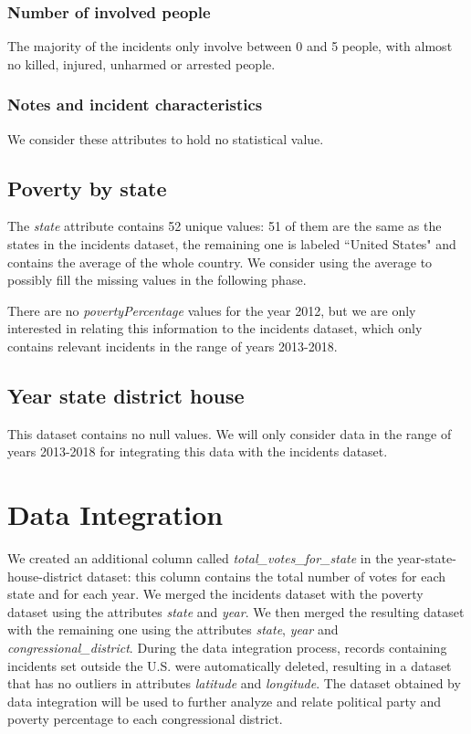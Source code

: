 \documentclass[10pt,a4paper]{report}
\begin{document}
\subsubsection{Number of involved people}

The majority of the incidents only involve between 0 and 5 people, with almost no killed, injured, unharmed or arrested people.

\subsubsection{Notes and incident characteristics}

We consider these attributes to hold no statistical value.

\subsection{Poverty by state}

The \textit{state} attribute contains 52 unique values: 51 of them are the same as the states in the incidents dataset, the remaining one is labeled ``United States" and contains the average of the whole country.
We consider using the average to possibly fill the missing values in the following phase.

There are no \textit{povertyPercentage} values for the year 2012, but we are only interested in relating this information to the incidents dataset, which only contains relevant incidents in the range of years 2013-2018.

\subsection{Year state district house}

This dataset contains no null values.
We will only consider data in the range of years 2013-2018 for integrating this data with the incidents dataset.

\section{Data Integration}

We created an additional column called \textit{total\_votes\_for\_state} in the year-state-house-district dataset: this column contains the total number of votes for each state and for each year.
We merged the incidents dataset with the poverty dataset using the attributes \textit{state} and \textit{year}.
We then merged the resulting dataset with the remaining one using the attributes \textit{state}, \textit{year} and \textit{congressional\_district}.
During the data integration process, records containing incidents set outside the U.S. were automatically deleted, resulting in a dataset that has no outliers in attributes \textit{latitude} and \textit{longitude}.
The dataset obtained by data integration will be used to further analyze and relate political party and poverty percentage to each congressional district.
\end{document}
